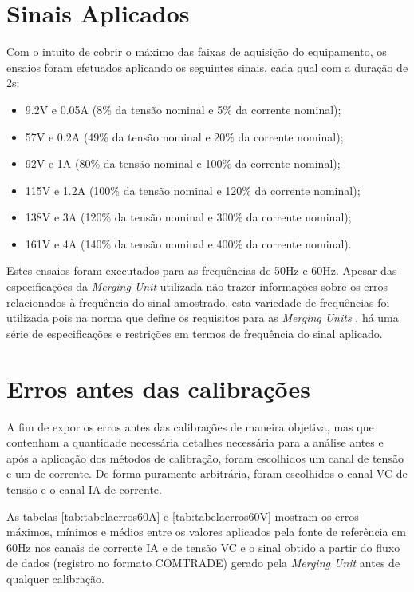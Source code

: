 \section{Sinais Aplicados}

Com o intuito de cobrir o máximo das faixas de aquisição do equipamento, os ensaios foram efetuados aplicando os seguintes sinais, cada qual com a duração de 2s:

\begin{itemize}
    \item 9.2V e 0.05A (8\% da tensão nominal e 5\% da corrente nominal);
    \item 57V e 0.2A (49\% da tensão nominal e 20\% da corrente nominal);
    \item 92V e 1A (80\% da tensão nominal e 100\% da corrente nominal);
    \item 115V e 1.2A (100\% da tensão nominal e 120\% da corrente nominal);
    \item 138V e 3A (120\% da tensão nominal e 300\% da corrente nominal);
    \item 161V e 4A (140\% da tensão nominal e 400\% da corrente nominal).
\end{itemize}

Estes ensaios foram executados para as frequências de 50Hz e 60Hz. Apesar das especificações da \textit{Merging Unit} utilizada não trazer informações sobre os erros relacionados à frequência do sinal amostrado, esta variedade de frequências foi utilizada pois na norma que define os requisitos para as \textit{Merging Units} \cite{IEC61869-13}, há uma série de especificações e restrições em termos de frequência do sinal aplicado.

\section{Erros antes das calibrações}

A fim de expor os erros antes das calibrações de maneira objetiva, mas que contenham a quantidade necessária detalhes necessária para a análise antes e após a aplicação dos métodos de calibração, foram escolhidos um canal de tensão e um de corrente. De forma puramente arbitrária, foram escolhidos o canal VC de tensão e o canal IA de corrente.

As tabelas \ref{tab:tabelaerros60A} e \ref{tab:tabelaerros60V} mostram os erros máximos, mínimos e médios entre os valores aplicados pela fonte de referência em 60Hz nos canais de corrente IA e de tensão VC e o sinal obtido a partir do fluxo de dados (registro no formato COMTRADE) gerado pela \textit{Merging Unit} antes de qualquer calibração. 

